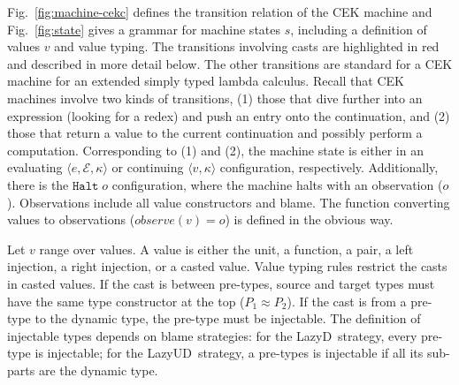 \documentclass[acmsmall,review,anonymous]{acmart}\settopmatter{printfolios=true,printccs=false,printacmref=false}
\newcommand{\lazyUD}{Lazy\;UD}
\newcommand{\lazyD}{Lazy\;D}
\newcommand{\sOOinspect}[3]{\langle#1,#2,#3\rangle}
\newcommand{\sOOreturn}[2]{\langle#1,#2\rangle}
\newcommand{\sOOhalt}[1]{\mathtt{Halt} \; #1}
\begin{document}
Fig.~\ref{fig:machine-cekc} defines the transition relation of the CEK
machine and Fig.~\ref{fig:state} gives a grammar for machine states
$s$, including a definition of values $v$ and value typing. 
The transitions involving casts are highlighted in red and described in
more detail below. The other transitions are standard for a CEK
machine for an extended simply typed lambda calculus.
%
Recall that CEK machines involve two kinds of transitions, (1) those
that dive further into an expression (looking for a redex) and push an
entry onto the continuation, and (2) those that return a value to the
current continuation and possibly perform a computation.
Corresponding to (1) and (2), the machine state is either in an evaluating
$\sOOinspect{e}{\mathcal{E}}{\kappa}$ or continuing $\sOOreturn{v}{\kappa}$ configuration, 
respectively. Additionally, there is the $\sOOhalt{o}$ configuration, where the 
machine halts with an observation ($o$). Observations include all value 
constructors and blame. The function converting values to 
observations ($observe(v) = o$) is defined in the obvious way.

Let $v$ range over values. A value is either the unit, a function, a pair, a 
left injection, a right injection, or a casted value. Value typing rules 
restrict the casts in casted values. If the cast is between pre-types, source 
and target types must have the same type constructor at the top ($P_1 \approx 
P_2$). If the cast is from a pre-type to the dynamic type, the pre-type must be 
injectable. The definition of injectable types depends on blame
strategies: for the \lazyD\ strategy, every pre-type is injectable;
for the \lazyUD\ strategy, a pre-types is injectable if all its sub-parts are 
the dynamic type.
\end{document}
